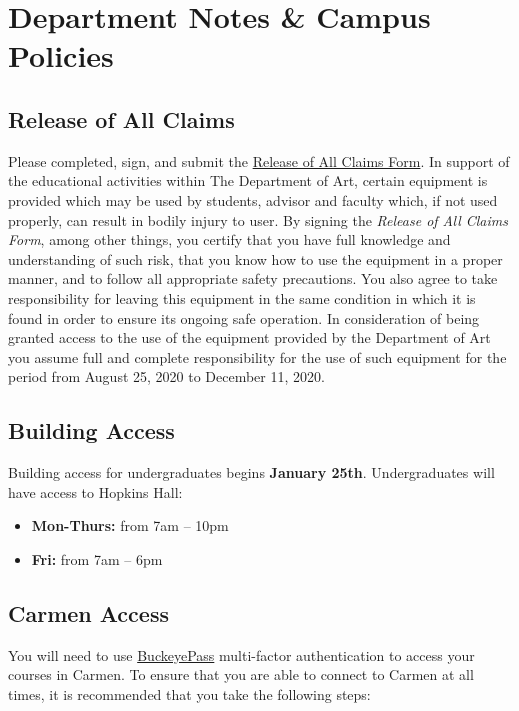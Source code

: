 \section[Campus Policies]{Department Notes \& Campus Policies}
\subsection{Release of All Claims}
Please completed, sign, and submit the \href{https://drive.google.com/file/d/1lfmTV3G5hzwf4YUvxlSUWwahs2fQIglq/view?usp=sharing}{Release of All Claims Form}. In support of the educational activities within The Department of Art, certain equipment is provided which may be used by students, advisor and faculty which, if not used properly, can result in bodily injury to user. By signing the \emph{Release of All Claims Form}, among other things, you certify that you have full knowledge and understanding of such risk, that you know how to use the equipment in a proper manner, and to follow all appropriate safety precautions. You also agree to take responsibility for leaving this equipment in the same condition in which it is found in order to ensure its ongoing safe operation. In consideration of being granted access to the use of the equipment provided by the Department of Art you assume full and complete responsibility for the use of such equipment for the period from August 25, 2020 to December 11, 2020.

\subsection{Building Access}
Building access for undergraduates begins \textbf{January 25th}. Undergraduates will have access to Hopkins Hall:
\begin{itemize}
      \tightlist
      \item \textbf{Mon-Thurs:} from 7am – 10pm
      \item \textbf{Fri:} from 7am – 6pm
\end{itemize}

\subsection{Carmen Access}

You will need to use \href{https://buckeyepass.osu.edu/}{BuckeyePass} multi-factor authentication to access your courses in Carmen. To ensure that you are able to connect to Carmen at all times, it is recommended that you take the following steps:

